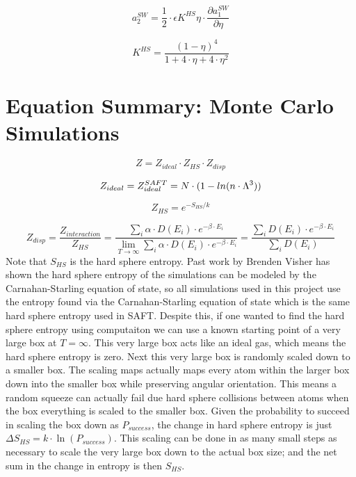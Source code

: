 \begin{multicols}{2}
\begin{equation}\label{eq:saft38}
a_2^{SW}=\frac{1}{2}\cdot \epsilon K^{HS}\eta\cdot \frac{\partial a_1^{SW}}{\partial \eta}
\end{equation}

\begin{equation}\label{eq:saft22}
K^{HS}=\frac{(1-\eta)^4}{1+4\cdot \eta+4\cdot \eta^2}
\end{equation}
\end{multicols}

\section{Equation Summary: Monte Carlo Simulations}
\begin{equation}\label{eq:MC1}
Z=Z_{ideal}\cdot Z_{HS}\cdot Z_{disp}
\end{equation}

\begin{equation}\label{eq:MC2}
Z_{ideal}=Z_{ideal}^{SAFT}=N\cdot(1-\\ln(n\cdot \Lambda^3))
\end{equation}

\begin{equation}\label{eq:MC3}
Z_{HS}=e^{-S_{HS}/k}
\end{equation}

\begin{equation}\label{eq:MC4}
Z_{disp}=\frac{Z_{interaction}}{Z_{HS}}=\frac{\sum_i \alpha\cdot D(E_i)\cdot e^{-\beta\cdot E_i}}{\lim_{T\to\infty}\sum_i \alpha\cdot D(E_i)\cdot e^{-\beta\cdot E_i}}=\frac{\sum_i D(E_i)\cdot e^{-\beta\cdot E_i}}{\sum_i D(E_i)}
\end{equation}
Note that $S_{HS}$ is the hard sphere entropy. Past work by Brenden Visher\cite{Brenden} has shown the hard sphere entropy of the simulations can be modeled by the Carnahan-Starling equation of state, so all simulations used in this project use the entropy found via the Carnahan-Starling equation of state which is the same hard sphere entropy used in SAFT. Despite this, if one wanted to find the hard sphere entropy using computaiton we can use a known starting point of a very large box at $T=\infty$. This very large box acts like an ideal gas, which means the hard sphere entropy is zero. Next this very large box is randomly scaled down to a smaller box. The scaling maps actually maps every atom within the larger box down into the smaller box while preserving angular orientation. This means a random squeeze can actually fail due hard sphere collisions between atoms when the box everything is scaled to the smaller box. Given the probability to succeed in scaling the box down as $P_{success}$, the change in hard sphere entropy is just $\Delta S_{HS}=k\cdot \ln(P_{success})$. This scaling can be done in as many small steps as necessary to scale the very large box down to the actual box size; and the net sum in the change in entropy is then $S_{HS}$.

